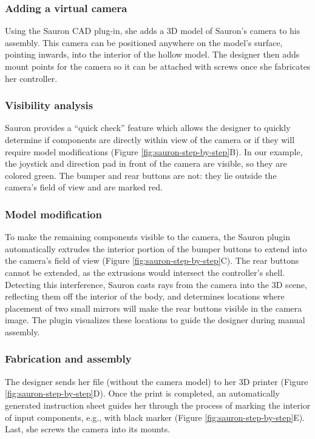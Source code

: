 \subsubsection{Adding a virtual camera} Using the Sauron CAD plug-in, she adds a 3D model of Sauron's camera to his assembly. This camera can be positioned anywhere on the model's surface, pointing inwards, into the interior of the hollow model. The designer then adds mount points for the camera so it can be attached with screws once she fabricates her controller.

\subsubsection{Visibility analysis} Sauron provides a ``quick check'' feature which allows the designer to quickly determine if components are directly within view of the camera or if they will require model modifications (Figure \ref{fig:sauron-step-by-step}B). %
In our example, the joystick and direction pad in front of the camera are visible, so they are colored green. The bumper and rear buttons are not: they lie outside the camera's field of view and are marked red. 

\subsubsection{Model modification} To make the remaining components visible to the camera, the Sauron plugin automatically extrudes the interior portion of the bumper buttons to extend into the camera's field of view (Figure \ref{fig:sauron-step-by-step}C). The rear buttons cannot be extended, as the extrusions would intersect the controller's shell. Detecting this interference, Sauron casts rays from the camera into the 3D scene, reflecting them off the interior of the body, and determines locations where placement of two small mirrors will make the rear buttons visible in the camera image. The plugin visualizes these locations to guide the designer during manual assembly.

\subsubsection{Fabrication and assembly} %
The designer sends her file (without the camera model) to her 3D printer (Figure \ref{fig:sauron-step-by-step}D). Once the print is completed, an automatically generated instruction sheet guides her through the process of marking the interior of input components, e.g., with black marker (Figure \ref{fig:sauron-step-by-step}E). Last, she screws the camera into its mounts. 


